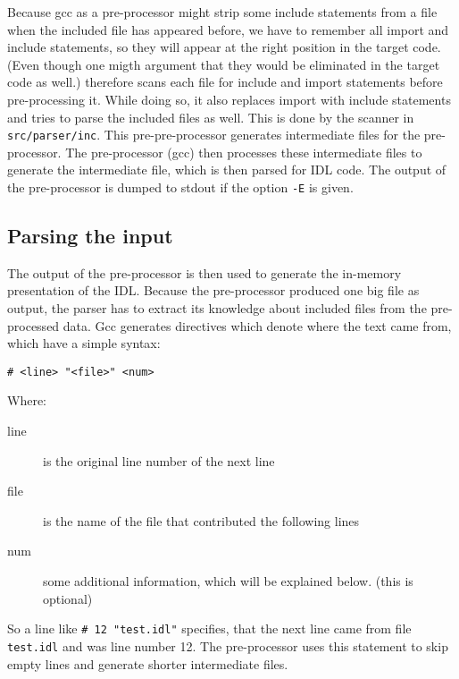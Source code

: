 Because gcc as a pre-processor might strip some include statements from
a file when the included file has appeared before, we have to remember
all import and include statements, so they will appear at the right
position in the target code. (Even though one migth argument that they
would be eliminated in the target code as well.) \dice{} therefore
scans each file for include and import statements before pre-processing
it. While doing so, it also replaces import with include statements and
tries to parse the included files as well.  This is done by the scanner
in \verb|src/parser/inc|.  This pre-pre-processor generates intermediate
files for the pre-processor.  The pre-processor (gcc) then processes 
these intermediate files to generate the intermediate file, which is 
then parsed for IDL code.  The output of the pre-processor is dumped to
stdout if the option \verb|-E| is given.

\subsection{Parsing the input}
The output of the pre-processor is then used to generate the in-memory
presentation of the IDL.  Because the pre-processor produced one big
file as output, the parser has to extract its knowledge about included
files from the pre-processed data.  Gcc generates directives which  
denote where the text came from, which have a simple syntax:

\begin{verbatim}
# <line> "<file>" <num>
\end{verbatim}

Where:

\begin{description}
\item[line] is the original line number of the next line
\item[file] is the name of the file that contributed the following lines
\item[num] some additional information, which will be explained below.
           (this is optional)
\end{description}

So a line like \verb|# 12 "test.idl"| specifies, that the next line came
from file \verb|test.idl| and was line number 12.  The pre-processor uses
this statement to skip empty lines and generate shorter intermediate files.

